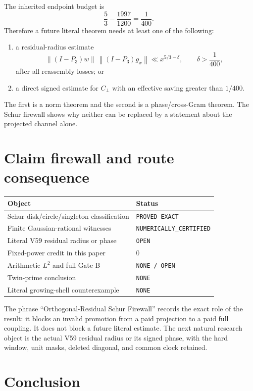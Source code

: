 \documentclass[11pt]{article}
\theoremstyle{definition}
\newcommand{\norm}[1]{\left\lVert #1\right\rVert}
\begin{document}
The inherited endpoint budget is
\[
 \frac53-\frac{1997}{1200}=\frac1{400}.
\]
Therefore a future literal theorem needs at least one of the following:
\begin{enumerate}
 \item a residual-radius estimate
 \[
  \norm{(I-P_3)w}\,\norm{(I-P_3)g_x}
       \ll x^{5/3-\delta},\qquad \delta>\frac1{400},
 \]
 after all reassembly losses; or
 \item a direct signed estimate for $C_\perp$ with an effective saving greater
       than $1/400$.
\end{enumerate}
The first is a norm theorem and the second is a phase/cross-Gram theorem.  The
Schur firewall shows why neither can be replaced by a statement about the
projected channel alone.

\section{Claim firewall and route consequence}

\begin{center}
\begin{tabular}{ll}
\toprule
Object & Status\\
\midrule
Schur disk/circle/singleton classification & \texttt{PROVED\_EXACT}\\
Finite Gaussian-rational witnesses & \texttt{NUMERICALLY\_CERTIFIED}\\
Literal V59 residual radius or phase & \texttt{OPEN}\\
Fixed-power credit in this paper & $0$\\
Arithmetic $L^2$ and full Gate B & \texttt{NONE / OPEN}\\
Twin-prime conclusion & \texttt{NONE}\\
Literal growing-shell counterexample & \texttt{NONE}\\
\bottomrule
\end{tabular}
\end{center}

The phrase ``Orthogonal-Residual Schur Firewall'' records the exact role of the
result: it blocks an invalid promotion from a paid projection to a paid full
coupling.  It does not block a future literal estimate.  The next natural
research object is the actual V59 residual radius or its signed phase, with the
hard window, unit masks, deleted diagonal, and common clock retained.

\section{Conclusion}
\end{document}
